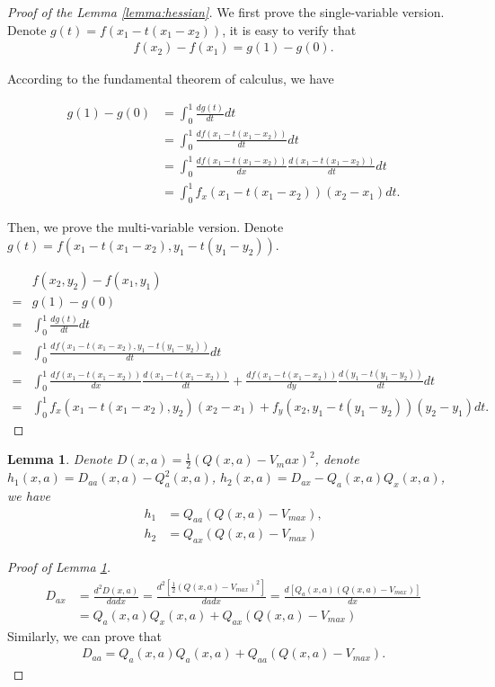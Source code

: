 \documentclass{article} %
\newcommand{\vmax}{V_{max}}
\newtheorem{lemma}{Lemma}
\begin{document}
\begin{proof}[Proof of the Lemma \ref{lemma:hessian}]
We first prove the single-variable version.
Denote   $g(t) = f(x_1-t(x_1 - x_2))$, it is easy to verify that 
\begin{align}
    f(x_2) - f(x_1) = g(1) - g(0) .
\end{align}

According to the fundamental theorem of calculus, we have

\begin{align}
    g(1) - g(0) &= \int_0^1 \frac{d g(t)}{dt} dt \\
      & = \int_0^1  \frac{d f(x_1-t(x_1 - x_2))}{dt}dt \\
      &= \int_0^1  \frac{d f(x_1-t(x_1 - x_2))}{dx} \frac{d (x_1-t(x_1 - x_2)) }{dt}dt \\
      &= \int_0^1 f_{x}(x_1- t(x_1-x_2))(x_2-x_1)dt.
\end{align}

Then, we prove the multi-variable version.
Denote $g(t) = f(x_1-t(x_1 - x_2) , y_1-t(y_1 - y_2)) $.

\begin{align}
    &f(x_2,y_2) - f(x_1,y_1) \\
    =& g(1) - g(0)  \\
    =& \int_0^1 \frac{d g(t)}{dt} dt \\
        =& \int_0^1  \frac{d f(x_1-t(x_1 - x_2) , y_1-t(y_1 - y_2))}{dt}dt \\
       =& \int_0^1  \frac{d f(x_1-t(x_1 - x_2))}{dx} \frac{d (x_1-t(x_1 - x_2)) }{dt} +\frac{d f(x_1-t(x_1 - x_2))}{dy} \frac{d (y_1-t(y_1 - y_2)) }{dt} dt \\
       =& \int_0^1 f_x(x_1 - t(x_1 - x_2), y_2)(x_2 - x_1) + f_y(x_2, y_1 - t(y_1- y_2))(y_2 - y_1)dt.
\end{align}

\end{proof}

\begin{lemma}\label{lemma:21apprx}
Denote $D(x,a) = \frac{1}{2}(Q(x,a)-V_max)^2$, denote $h_1(x,a) = D_{aa}(x,a) - Q_a^2(x,a)  $, $h_2(x,a) =  D_{ax} - Q_{a}(x,a)Q_x(x,a) $, we have
\begin{align}
    h_1 &= Q_{aa}(Q(x,a)-\vmax),\\
    h_2 &= Q_{ax}(Q(x,a) - \vmax)
\end{align}
\end{lemma}

\begin{proof} [Proof of Lemma \ref{lemma:21apprx}]
\begin{align}
    D_{ax} &= \frac{d^2 D(x,a)}{dadx} = \frac{d^2 \left[\frac{1}{2} (Q(x,a)-\vmax)^2\right] }{dadx} = \frac{d \left[ Q_a(x,a)(Q(x,a) - \vmax) \right] }{dx } \\
    &= Q_a(x,a)Q_x(x,a) + Q_{ax}(Q(x,a) - \vmax)
\end{align}
Similarly, we can prove that 
\begin{align}
    D_{aa} = Q_a(x,a)Q_a(x,a) + Q_{aa}(Q(x,a)-\vmax).
\end{align}
\end{proof}
\end{document}
